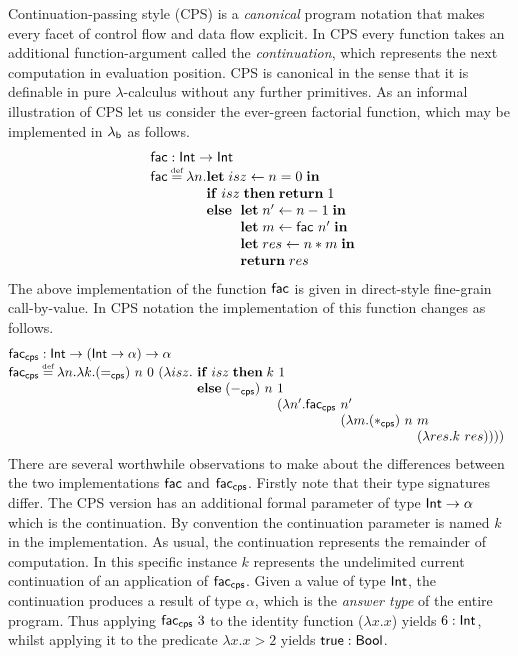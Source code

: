 \documentclass[12pt,phd,lfcs,twoside,openright,logo,leftchapter,normalheadings]{infthesis}
\theoremstyle{plain}
\theoremstyle{definition}
\begin{document}
Continuation-passing style (CPS) is a \emph{canonical} program
notation that makes every facet of control flow and data flow
explicit. In CPS every function takes an additional function-argument
called the \emph{continuation}, which represents the next computation
in evaluation position. CPS is canonical in the sense that it is
definable in pure $\lambda$-calculus without any further
primitives. As an informal illustration of CPS let us consider the
ever-green factorial function, which may be implemented in $\lambda_{\mathsf{b}}$ as
follows.
%
\[
  \bl
    \dec{fac} : \Int \to \Int\\
    \dec{fac} \defas \lambda n.
       \ba[t]{@{}l}
         \Let\;isz \revto n = 0\;\In\\
         \If\;isz\;\Then\; \Return\;1\\
         \Else\;\ba[t]{@{~}l}
                   \Let\; n' \revto n - 1 \;\In\\
                   \Let\; m \revto \dec{fac}~n' \;\In\\
                   \Let\;res \revto n * m \;\In\\
                   \Return\;res
                 \ea
       \ea
  \el
\]
%
The above implementation of the function $\mathsf{fac}$ is given in
direct-style fine-grain call-by-value. In CPS notation the
implementation of this function changes as follows.
%
\[
  \bl
  \dec{fac}_{\dec{cps}} : \Int \to (\Int \to \alpha) \to \alpha\\
  \dec{fac}_{\dec{cps}} \defas \lambda n.\lambda k.
     (=_{\dec{cps}})~n~0~
       (\lambda isz.
          \ba[t]{@{~}l}
          \If\;isz\;\Then\; k~1\\
          \Else\;
          (-_{\dec{cps}})~n~\bl 1\\
            (\lambda n'.
               \dec{fac}_{\dec{cps}}~\bl n'\\
               (\lambda m. (*_{\dec{cps}})~n~\bl m\\
               (\lambda res. k~res))))
               \el
               \el
               \el
          \ea
  \el
\]
%
There are several worthwhile observations to make about the
differences between the two implementations $\mathsf{fac}$ and
$\mathsf{fac}_{\mathsf{cps}}$.
%
Firstly note that their type signatures differ. The CPS version has an
additional formal parameter of type $\mathsf{Int} \to \alpha$ which is the
continuation. By convention the continuation parameter is named $k$ in
the implementation. As usual, the continuation represents the
remainder of computation. In this specific instance $k$ represents the
undelimited current continuation of an application of
$\mathsf{fac}_{\mathsf{cps}}$. Given a value of type $\mathsf{Int}$, the
continuation produces a result of type $\alpha$, which is the
\emph{answer type} of the entire program. Thus applying
$\mathsf{fac}_{\mathsf{cps}}~3$ to the identity function ($\lambda x.x$)
yields $6 : \mathsf{Int}$, whilst applying it to the predicate
$\lambda x. x > 2$ yields $\mathsf{true} : \mathsf{Bool}$.
%
\end{document}
